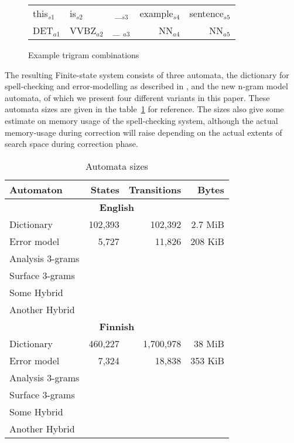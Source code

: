 \documentclass[11pt,a4paper]{article}
\begin{document}
\begin{figure}[h]
\begin{centering}
\caption{Example trigram combinations\label{fig:example}}
\begin{scriptsize}
\begin{tabular}{llcrr}
\hline
this$_{s1}$ & is$_{s2}$ & \_$_{s3}$ & example$_{s4}$ & sentence$_{s5}$\\
DET$_{a1}$ & VVBZ$_{a2}$ & \_ $_{a3}$& NN$_{a4}$ & NN$_{a5}$\\
\hline
\end{tabular}
\end{scriptsize}
\end{centering}
\end{figure}

The resulting Finite-state system consists of three automata, the dictionary
for spell-checking and error-modelling as described in
\cite{pirinen/2010/lrec}, and the new n-gram model automata, of which
we present four different variants in this paper. These automata sizes are given
in the table~\ref{table:sizes} for reference. The sizes also give some estimate
on memory usage of the spell-checking system, although the actual memory-usage
during correction will raise depending on the actual extents of search space
during correction phase.

\begin{table}
\begin{centering}
\caption{Automata sizes\label{table:sizes}}
\begin{scriptsize}
\begin{tabular}{lrrr}
    Automaton & States & Transitions & Bytes \\
    \hline
    \multicolumn{4}{c}{\textbf{English}} \\
    \hline
    Dictionary & 102,393 & 102,392 & 2.7 MiB \\
    Error model & 5,727 & 11,826 & 208 KiB \\
    \hline
    Analysis 3-grams & & & \\
    Surface 3-grams & & & \\
    Some Hybrid & & & \\
    Another Hybrid & & & \\
    \hline
    \multicolumn{4}{c}{\textbf{Finnish}} \\
    \hline
    Dictionary & 460,227 & 1,700,978 & 38 MiB \\
    Error model & 7,324 & 18,838 & 353 KiB \\
    \hline
    Analysis 3-grams & & & \\
    Surface 3-grams & & & \\
    Some Hybrid & & & \\
    Another Hybrid & & & \\
    \hline
\end{tabular}
\end{scriptsize}
\end{centering}
\end{table}
\end{document}
